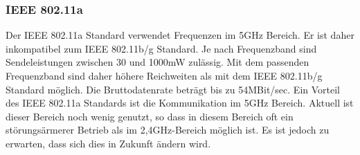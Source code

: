         \subsubsection{IEEE 802.11a}
            Der IEEE 802.11a Standard verwendet Frequenzen im 5GHz Bereich. Er ist daher
            inkompatibel zum IEEE 802.11b/g Standard. Je nach Frequenzband sind 
            Sendeleistungen zwischen 30 und 1000mW zulässig. Mit dem passenden Frequenzband
            sind daher höhere Reichweiten als mit dem IEEE 802.11b/g Standard möglich.
            Die Bruttodatenrate beträgt bis zu 54MBit/sec. 
            Ein Vorteil des IEEE 802.11a Standards ist die Kommunikation im 5GHz Bereich.
            Aktuell ist dieser Bereich noch wenig genutzt, so dass in diesem
            Bereich oft ein störungsärmerer Betrieb als im 2,4GHz-Bereich möglich ist.
            Es ist jedoch zu erwarten, dass sich dies in Zukunft ändern wird.

